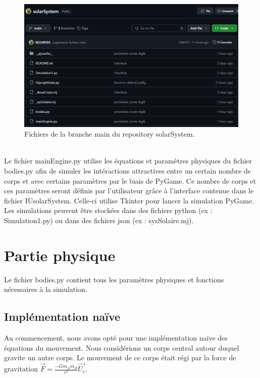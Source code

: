 \documentclass{article}
\begin{document}
    \\

    \begin{figure}[h]
        \centering
        \includegraphics[width=0.5\linewidth]{imgGitHub.png}
        \caption{\label{fig:Git}Fichiers de la branche main du repository solarSystem.}
    \end{figure}

    \\

    Le fichier mainEngine.py utilise les équations et paramètres physiques du fichier bodies.py afin de simuler les intéractions attractives entre un certain nombre de corps et avec certains paramètres par le biais de PyGame. Ce nombre de corps et ces paramètres seront définis par l'utilisateur grâce à l'interface contenue dans le fichier IUsolarSystem. Celle-ci utilise Tkinter pour lancer la simulation PyGame. Les simulations peuvent être stockées dans des fichiers python (ex : Simulation1.py) ou dans des fichiers json (ex : sysSolaire.mj).

\section{Partie physique}

    Le fichier bodies.py contient tous les paramètres physiques et fonctions nécessaires à la simulation.
    
    \subsection{Implémentation naïve}

        Au commencement, nous avons opté pour une implémentation naïve des équations du mouvement. Nous considérions un corps central autour duquel gravite un autre corps. Le mouvement de ce corps était régi par la force de gravitation $\vec{F} = \frac{-G m_A m_B}{r^2} \vec{U_r}$.

        \paragraph{}
\end{document}
